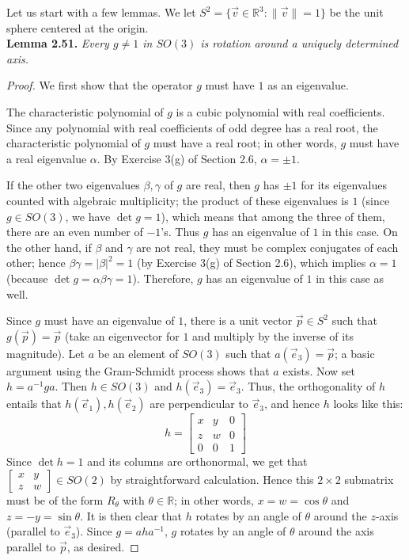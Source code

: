 \documentclass[leqno]{book}
\begin{document}
Let us start with a few lemmas.  We let $S^2=\{\vec v\in\mathbb R^3:\|\vec v\|=1\}$ be the unit sphere centered at the origin.\\

\noindent\textbf{Lemma 2.51.} \emph{Every $g\ne 1$ in $SO(3)$ is rotation around a uniquely determined axis.}
\begin{proof}
We first show that the operator $g$ must have $1$ as an eigenvalue.

The characteristic polynomial of $g$ is a cubic polynomial with real coefficients.  Since any polynomial with real coefficients of odd degree has a real root, the characteristic polynomial of $g$ must have a real root; in other words, $g$ must have a real eigenvalue $\alpha$.  By Exercise 3(g) of Section 2.6, $\alpha=\pm 1$.

If the other two eigenvalues $\beta,\gamma$ of $g$ are real, then $g$ has $\pm 1$ for its eigenvalues counted with algebraic multiplicity; the product of these eigenvalues is $1$ (since $g\in SO(3)$, we have $\det g=1$), which means that among the three of them, there are an even number of $-1$'s.  Thus $g$ has an eigenvalue of $1$ in this case.  On the other hand, if $\beta$ and $\gamma$ are not real, they must be complex conjugates of each other; hence $\beta\gamma=|\beta|^2=1$ (by Exercise 3(g) of Section 2.6), which implies $\alpha=1$ (because $\det g=\alpha\beta\gamma=1$).  Therefore, $g$ has an eigenvalue of $1$ in this case as well.

Since $g$ must have an eigenvalue of $1$, there is a unit vector $\vec p\in S^2$ such that $g(\vec p)=\vec p$ (take an eigenvector for $1$ and multiply by the inverse of its magnitude).  Let $a$ be an element of $SO(3)$ such that $a(\vec e_3)=\vec p$; a basic argument using the Gram-Schmidt process shows that $a$ exists.  Now set $h=a^{-1}ga$.  Then $h\in SO(3)$ and $h(\vec e_3)=\vec e_3$.  Thus, the orthogonality of $h$ entails that $h(\vec e_1),h(\vec e_2)$ are perpendicular to $\vec e_3$, and hence $h$ looks like this:
$$h=\begin{bmatrix}x&y&0\\z&w&0\\0&0&1\end{bmatrix}$$
Since $\det h=1$ and its columns are orthonormal, we get that $\begin{bmatrix}x&y\\z&w\end{bmatrix}\in SO(2)$ by straightforward calculation.  Hence this $2\times 2$ submatrix must be of the form $R_\theta$ with $\theta\in\mathbb R$; in other words, $x=w=\cos\theta$ and $z=-y=\sin\theta$.  It is then clear that $h$ rotates by an angle of $\theta$ around the $z$-axis (parallel to $\vec e_3$).  Since $g=aha^{-1}$, $g$ rotates by an angle of $\theta$ around the axis parallel to $\vec p$, as desired.


\end{proof}
\end{document}
